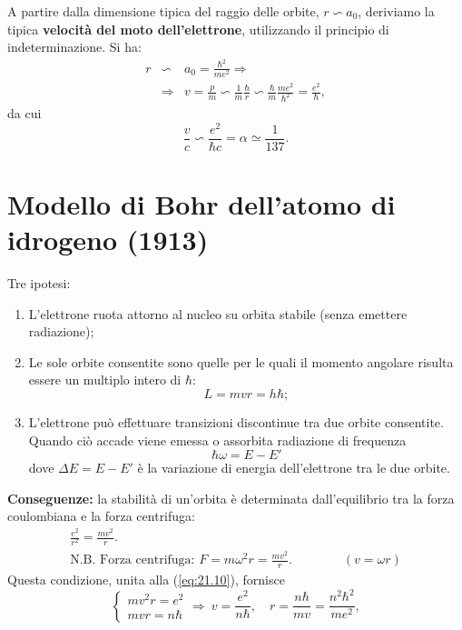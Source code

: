 \documentclass[a4paper,12pt,oneside]{book}
\begin{document}
A partire dalla dimensione tipica del raggio delle orbite, $r \backsim a_0$, deriviamo la tipica \textbf{velocità del moto dell'elettrone}, utilizzando il principio di indeterminazione. Si ha:
\begin{eqnarray}
r & \backsim & a_0 =\frac{\hbar ^2}{me^2} \Rightarrow \nonumber \\
& \Rightarrow & v=\frac{p}{m} \backsim \frac{1}{m} \frac{\hbar}{r}\backsim \frac{\hbar}{m}\frac{me^2}{\hbar ^2}=\frac{e^2}{\hbar}, 
\end{eqnarray}
da cui
\begin{equation}
\frac{v}{c}\backsim \frac{e^2}{\hbar c}=\alpha \simeq \frac{1}{137}.
\end{equation}
\section{Modello di Bohr dell'atomo di idrogeno (1913)}
Tre ipotesi:
\begin{enumerate}
\item L'elettrone ruota attorno al nucleo su orbita stabile (senza emettere radiazione);
\item Le sole orbite consentite sono quelle per le quali il momento angolare risulta essere un multiplo intero di $\hbar$:
\begin{equation}
L=mvr=h\hbar;
\label{eq:21.10}
\end{equation}
\item L'elettrone può effettuare transizioni discontinue tra due orbite consentite. Quando ciò accade viene emessa o assorbita radiazione di frequenza
\begin{equation}
\hbar \omega = E-E'
\end{equation}
dove $\Delta E = E-E'$ è la variazione di energia dell'elettrone tra le due orbite.
\end{enumerate}
\textbf{Conseguenze:} la stabilità di un'orbita è determinata dall'equilibrio tra la forza coulombiana e la forza centrifuga:
\begin{eqnarray}
&\displaystyle{\frac{e^2}{r^2}=\frac{mv^2}{r}.}&\\
&\textrm{N.B. Forza centrifuga: } F=m\omega ^2 r = \frac{mv^2}{r}. \qquad \qquad (v=\omega r)& \nonumber
\end{eqnarray}
Questa condizione, unita alla (\ref{eq:21.10}), fornisce
\begin{equation}
\begin{cases}
mv^2r=e^2\\
mvr=n\hbar
\end{cases}
\Rightarrow \ v=\frac{e^2}{n\hbar}, \quad r=\frac{n\hbar}{mv}=\frac{n^2\hbar ^2}{me^2},
\end{equation}
\end{document}
